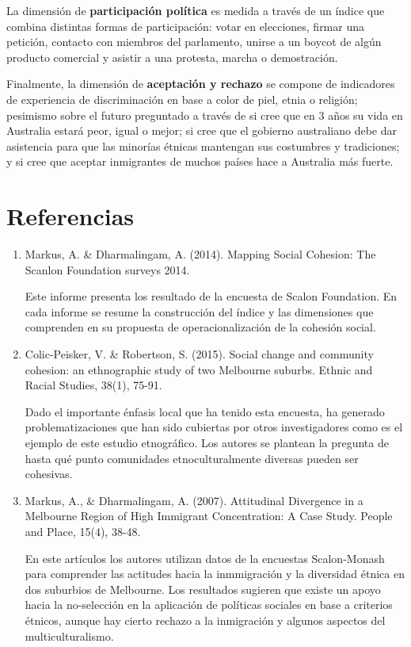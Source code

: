 \documentclass[
  12pt,
]{book}
\begin{document}
La dimensión de \textbf{participación política} es medida a través de un índice que combina distintas formas de participación: votar en elecciones, firmar una petición, contacto con miembros del parlamento, unirse a un boycot de algún producto comercial y asistir a una protesta, marcha o demostración.

Finalmente, la dimensión de \textbf{aceptación y rechazo} se compone de indicadores de experiencia de discriminación en base a color de piel, etnia o religión; pesimismo sobre el futuro preguntado a través de si cree que en 3 años su vida en Australia estará peor, igual o mejor; si cree que el gobierno australiano debe dar asistencia para que las minorías étnicas mantengan sus costumbres y tradiciones; y si cree que aceptar inmigrantes de muchos países hace a Australia más fuerte. \citep{colic-peisker_Social_2015}

\hypertarget{referencias}{%
\section{Referencias}\label{referencias}}

\begin{enumerate}
\def\labelenumi{\arabic{enumi}.}
\item
  Markus, A. \& Dharmalingam, A. (2014). Mapping Social Cohesion: The
  Scanlon Foundation surveys 2014.

  Este informe presenta los resultado de la encuesta de Scalon Foundation. En cada informe se resume la construcción del índice y las dimensiones que comprenden en su propuesta de operacionalización de la cohesión social.
\item
  Colic-Peisker, V. \& Robertson, S. (2015). Social change and
  community cohesion: an ethnographic study of two Melbourne suburbs.
  Ethnic and Racial Studies, 38(1), 75-91.

  Dado el importante énfasis local que ha tenido esta encuesta, ha
  generado problematizaciones que han sido cubiertas por otros
  investigadores como es el ejemplo de este estudio etnográfico. Los
  autores se plantean la pregunta de hasta qué punto comunidades
  etnoculturalmente diversas pueden ser cohesivas.
\item
  Markus, A., \& Dharmalingam, A. (2007). Attitudinal Divergence in a
  Melbourne Region of High Immigrant Concentration: A Case Study.
  People and Place, 15(4), 38-48.

  En este artículos los autores utilizan datos de la encuestas
  Scalon-Monash para comprender las actitudes hacia la inmmigración y
  la diversidad étnica en dos suburbios de Melbourne. Los resultados
  sugieren que existe un apoyo hacia la no-selección en la aplicación
  de políticas sociales en base a criterios étnicos, aunque hay cierto
  rechazo a la inmigración y algunos aspectos del multiculturalismo.
\end{enumerate}
\end{document}
